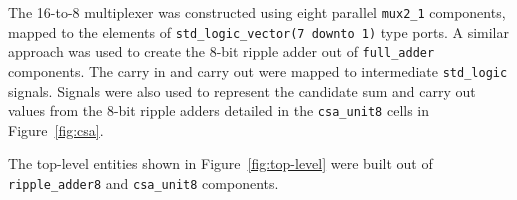 \documentclass[a4paper,11pt]{article}
\begin{document}
\begin{center}
	\hspace{-\textwidth}%
	\begin{minipage}{0.6\textwidth}
		
	\end{minipage}%
	\hspace{2em}%
	\begin{minipage}{0.51\textwidth}
		
	\end{minipage}%
	\hspace{-\textwidth}

\end{center}

The 16-to-8 multiplexer was constructed using eight parallel \texttt{mux2\_1} components, mapped to the elements of \texttt{std\_logic\_vector(7 downto 1)} type ports. A similar approach was used to create the 8-bit ripple adder out of \texttt{full\_adder} components. The carry in and carry out were mapped to intermediate \texttt{std\_logic} signals. Signals were also used to represent the candidate sum and carry out values from the 8-bit ripple adders detailed in the \texttt{csa\_unit8} cells in Figure~\ref{fig:csa}.

The top-level entities shown in Figure~\ref{fig:top-level} were built out of \texttt{ripple\_adder8} and \texttt{csa\_unit8} components.
\end{document}
